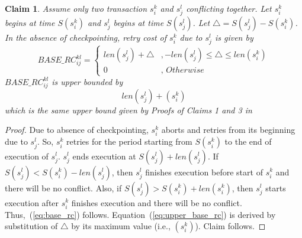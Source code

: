 \documentclass[preprint]{sigplanconf}
\newtheorem{clm}{Claim}
\begin{document}
\begin{clm}\label{clm:basic_rc}
Assume only two transaction $s_i^k$ and $s_j^l$ conflicting together. Let $s_i^k$ begins at time $S\left(s_i^k\right)$ and $s_j^l$ begins at time $S\left(s_j^l\right)$. Let $\triangle=S\left(s_j^l\right)-S\left(s_i^k\right)$. In the absence of checkpointing, retry cost of $s_i^k$ due to $s_j^l$ is given by
%
\begin{equation}
BASE\_RC_{ij}^{kl}=\begin{cases}
len\left(s_{j}^{l}\right)+\triangle & ,-len\left(s_{j}^{l}\right)\le\triangle\le len\left(s_{i}^{k}\right)\\
0 & ,\, Otherwise
\end{cases}
\label{eq:base_rc}
\end{equation}
%
$BASE\_RC_{ij}^{kl}$ is upper bounded by 
\begin{equation}
len\left(s_j^l\right)+\left(s_i^k\right)\label{eq:upper_base_rc}
\end{equation}
%
which is the same upper bound given by Proofs of Claims 1 and 3 in~\cite{stmconcurrencycontrol:emsoft11}
\end{clm}
%
\begin{proof}
Due to absence of checkpointing, $s_i^k$ aborts and retries from its beginning due to $s_j^l$. So, $s_i^k$ retries for the period starting from $S\left(s_i^k\right)$ to the end of execution of $s_j^l$. $s_j^l$ ends execution at $S\left(s_j^l\right)+len\left(s_j^l\right)$. If $S\left(s_j^l\right)<S\left(s_i^k\right)-len\left(s_j^l\right)$, then $s_j^l$ finishes execution before start of $s_i^k$ and there will be no conflict. Also, if $S\left(s_j^l\right)>S\left(s_i^k\right)+len\left(s_i^k\right)$, then $s_j^l$ starts execution after $s_i^k$ finishes execution and there will be no conflict. Thus,~(\ref{eq:base_rc}) follows. Equation~(\ref{eq:upper_base_rc}) is derived by substitution of $\triangle$ by its maximum value (i.e., $\left(s_{i}^{k}\right)$). Claim follows.
\end{proof}
%
\end{document}
